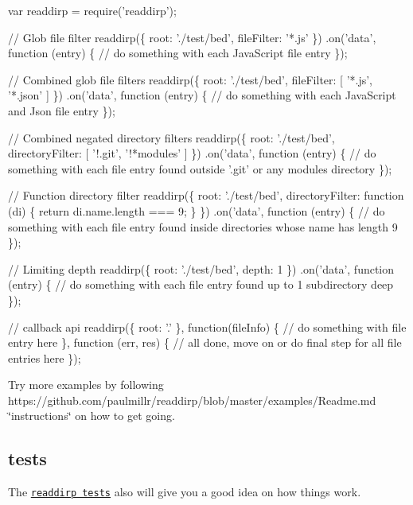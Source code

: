 \begin{DoxyCode}
var readdirp = require('readdirp');

// Glob file filter
readdirp(\{ root: './test/bed', fileFilter: '*.js' \})
  .on('data', function (entry) \{
    // do something with each JavaScript file entry
  \});

// Combined glob file filters
readdirp(\{ root: './test/bed', fileFilter: [ '*.js', '*.json' ] \})
  .on('data', function (entry) \{
    // do something with each JavaScript and Json file entry
  \});

// Combined negated directory filters
readdirp(\{ root: './test/bed', directoryFilter: [ '!.git', '!*modules' ] \})
  .on('data', function (entry) \{
    // do something with each file entry found outside '.git' or any modules directory
  \});

// Function directory filter
readdirp(\{ root: './test/bed', directoryFilter: function (di) \{ return di.name.length === 9; \} \})
  .on('data', function (entry) \{
    // do something with each file entry found inside directories whose name has length 9
  \});

// Limiting depth
readdirp(\{ root: './test/bed', depth: 1 \})
  .on('data', function (entry) \{
    // do something with each file entry found up to 1 subdirectory deep
  \});

// callback api
readdirp(\{ root: '.' \}, function(fileInfo) \{
   // do something with file entry here
  \}, function (err, res) \{
    // all done, move on or do final step for all file entries here
\});
\end{DoxyCode}


Try more examples by following https\+://github.com/paulmillr/readdirp/blob/master/examples/\+Readme.\+md \char`\"{}instructions\char`\"{} on how to get going.

\subsection*{tests}

The \href{https://github.com/paulmillr/readdirp/blob/master/test/readdirp.js}{\tt readdirp tests} also will give you a good idea on how things work. 